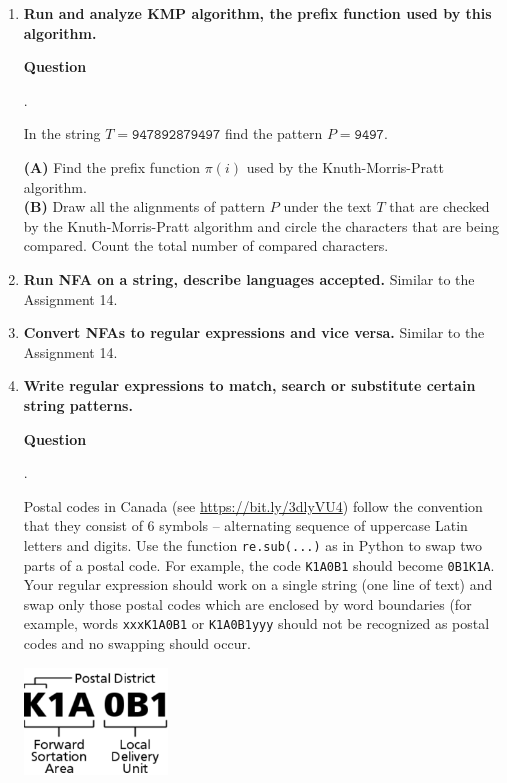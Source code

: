 \documentclass[a4paper,12pt]{article}
\newcounter{mcounter}
\newcommand\showmcounter{\addtocounter{mcounter}{1}\themcounter}
\begin{document}
{\begin{enumerate}[label=4.\Alph*.]
\item {\bf Run and analyze KMP algorithm, the prefix function used by this algorithm.}

\vspace{10pt}
{\bf Question \showmcounter.}
In the string $T = \mathtt{947892879497}$ find the pattern $P = \mathtt{9497}$.

{\bf (A)} Find the prefix function $\pi(i)$ used by the Knuth-Morris-Pratt algorithm.\\
{\bf (B)} Draw all the alignments of pattern $P$ under the text $T$ that are checked
by the Knuth-Morris-Pratt algorithm and circle the characters that are being compared. 
Count the total number of compared characters.


\item {\bf Run NFA on a string, describe languages accepted.}
Similar to the Assignment 14.

\item {\bf Convert NFAs to regular expressions and vice versa.}
Similar to the Assignment 14.



\item {\bf Write regular expressions to match, search or substitute certain string patterns.}

\vspace{10pt}
{\bf Question \showmcounter.}
Postal codes in Canada (see \url{https://bit.ly/3dlyVU4}) follow the convention 
that they consist of 6 symbols -- alternating sequence of uppercase Latin letters and digits. 
Use the function {\tt re.sub(...)} as in Python to swap two parts of a postal code. 
For example, the code {\tt K1A0B1} should become {\tt 0B1K1A}.
Your regular expression should work on a single string (one line of text) 
and swap only those postal codes which are enclosed by 
word boundaries (for example, words {\tt xxxK1A0B1} or {\tt K1A0B1yyy} should not 
be recognized as postal codes and no swapping should occur.
\begin{center}
\includegraphics[width=1.5in]{ds-exam3/canadian-postal-code.png}
\end{center}


\end{enumerate}}
\end{document}
